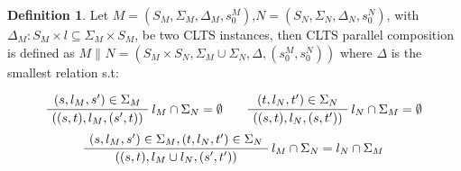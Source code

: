 \documentclass{article}
\theoremstyle{definition}
\newtheorem{definition}{Definition}[section]
\newcommand{\automaton}[1]{$#1 = (S_{#1}, \Sigma_{#1}, \Delta_{#1}, s_{0}^{#1})$}
\newcommand{\ltsComposition}[3]{$#1 \parallel_{#3} #2 = (S_{#1}\times S_{#2}, \Sigma_{#1} \cup \Sigma_{#2}, \Delta, (s_{0}^{#1},s_{0}^{#2}))$}
\begin{document}
\begin{definition} 
	Let \automaton{M},\automaton{N}, with $\Delta_M : S_M \times l \subseteq \Sigma_M \times S_M$, be two CLTS instances, then CLTS parallel composition is defined as \ltsComposition{M}{N}{} where $\Delta$ is the smallest relation s.t:
	\begin{center}
		\begin{equation}
			\AxiomC{$(s, l_M, s') \in \Sigma_M $}\RightLabel{$l_M \cap \Sigma_N = \emptyset$}
			\UnaryInfC{$((s,t),l_M,(s',t))$}
			\DisplayProof
			\quad\quad
			\AxiomC{$(t, l_N, t') \in \Sigma_N $}\RightLabel{$l_N \cap \Sigma_M = \emptyset$}
			\UnaryInfC{$((s,t),l_N,(s,t'))$}
			\DisplayProof
		\end{equation}		
		\begin{equation}
		\AxiomC{$(s, l_M, s') \in \Sigma_M,(t, l_N, t') \in \Sigma_N  $}\RightLabel{$l_M \cap \Sigma_N = l_N \cap \Sigma_M$}
		\UnaryInfC{$((s,t),l_M \cup l_N,(s',t'))$}
		\DisplayProof
		\end{equation}	
	\end{center}
\end{definition}
\end{document}
